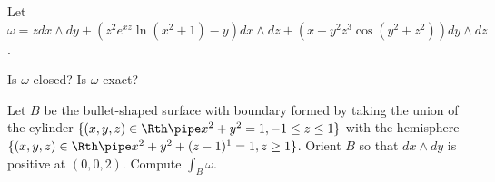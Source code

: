 Let $\omega= z dx\wedge dy+(z^2 e^{xz}\ln(x^2+1)-y)dx\wedge dz+
(x+y^2z^3\cos (y^2+z^2))dy\wedge dz$.
\begin{alist}
\item Is $\omega$ closed? Is $\omega$ exact?
\item Let $B$ be the bullet-shaped surface with boundary formed 
by taking the union of the cylinder $\{(x,y,z)\in \Rth \pipe
x^2+y^2=1, -1\leq z\leq 1\}$ with the hemisphere $\{(x,y,z)\in
\Rth\pipe x^2+y^2+(z-1)^1=1, z\geq 1\}$. Orient $B$ so that $dx\wedge
dy$ is positive at $(0,0,2)$. Compute $\int_B\omega$.
\end{alist}

